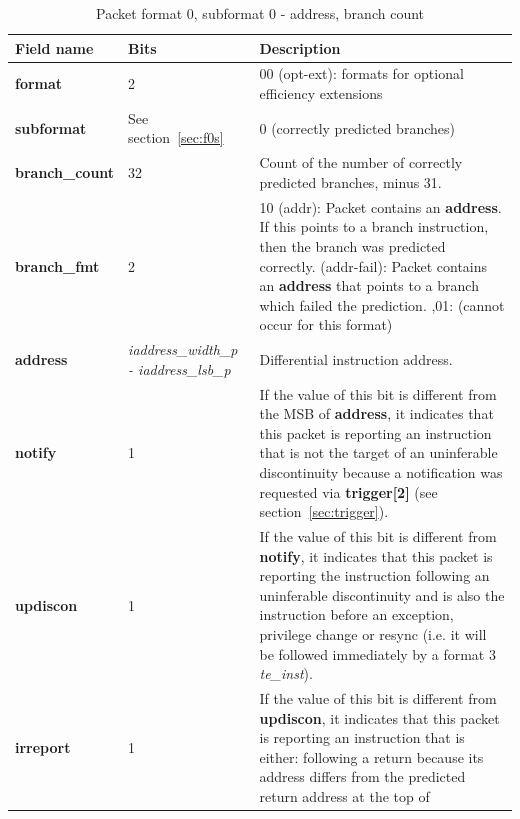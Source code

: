 \begin{table}[htp]
  \centering
  \caption{Packet format 0, subformat 0 - address, branch count}
  \label{tab:te_inst0-0-addr-count}
  \begin{tabulary}{\textwidth}{|l|p{35mm}|p{90mm}|}
    \hline
    {\bf Field name} & {\bf Bits} & {\bf Description} \\
    \hline
    \textbf{format}	& 2	& 00 (opt-ext): formats for optional efficiency extensions\\
    \hline
    \textbf{subformat}  & See section~\ref{sec:f0s} & 0 (correctly predicted branches)\\
    \hline
    \textbf{branch\_count} & 32 & Count of the number of correctly predicted branches, minus 31. \\
    \hline
    \textbf{branch\_fmt} & 2 & 10 (addr): Packet contains an \textbf{address}.  If this points to
    a branch instruction, then the branch was predicted correctly.  (addr-fail): Packet contains an \textbf{address} that points to a branch which failed the prediction. ,01: (cannot occur for this format) \\ 
    \hline
    \textbf{address}	& \textit {iaddress\_width\_p - iaddress\_lsb\_p} & 
                Differential instruction address.\\
    \hline
    \textbf{notify}	& 1 & 
                If the value of this bit is different from the MSB of \textbf{address}, it indicates that this 
                packet is reporting an instruction that is not the target of an uninferable discontinuity 
                because a notification was requested via \textbf{trigger[2]} (see section~\ref{sec:trigger}). \\
    \hline
    \textbf{updiscon}	& 1 & 
                If the value of this bit is different from \textbf{notify}, it indicates that this 
                packet is reporting the instruction following an uninferable discontinuity and is also the 
                instruction before an exception, privilege change or resync 
                (i.e. it will be followed immediately by a format 3 \textit{te\_inst}).\\
    \hline
    \textbf{irreport}	& 1 & 
                If the value of this bit is different from \textbf{updiscon}, it indicates that this packet is
                reporting an instruction that is either: \newline
                following a return because its address differs from the predicted return address at the top of 

\end{tabulary}
\end{table}
